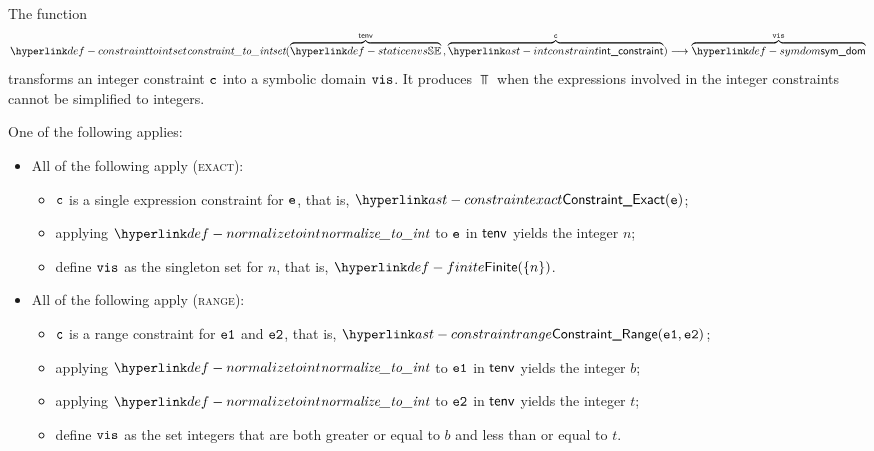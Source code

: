 \hypertarget{def-constrainttointset}{}
The function
\[
  \constrainttointset(
    \overname{\staticenvs}{\tenv} \aslsep
    \overname{\intconstraint}{\vc}
  ) \aslto
  \overname{\symdom}{\vis}
\]
transforms an integer constraint $\texttt{c}$ into a symbolic domain $\texttt{vis}$.
It produces $\Top$ when the expressions involved in the integer constraints cannot be simplified
to integers.

\ProseParagraph
One of the following applies:
\begin{itemize}
  \item All of the following apply (\textsc{exact}):
  \begin{itemize}
    \item $\texttt{c}$ is a single expression constraint for $\texttt{e}$, that is, $\ConstraintExact(\ve)$;
    \item applying $\normalizetoint$ to $\texttt{e}$ in $\textsf{tenv}$ yields the integer $n$\ProseTerminateAs{\Top};
    \item define $\texttt{vis}$ as the singleton set for $n$, that is, $\Finite(\{n\})$.
  \end{itemize}

  \item All of the following apply (\textsc{range}):
  \begin{itemize}
    \item $\texttt{c}$ is a range constraint for $\texttt{e1}$ and $\texttt{e2}$, that is, $\ConstraintRange(\veone, \vetwo)$;
    \item applying $\normalizetoint$ to $\texttt{e1}$ in $\textsf{tenv}$ yields the integer $b$\ProseTerminateAs{\Top};
    \item applying $\normalizetoint$ to $\texttt{e2}$ in $\textsf{tenv}$ yields the integer $t$\ProseTerminateAs{\Top};
    \item define $\texttt{vis}$ as the set integers that are both greater or equal to $b$ and less than or equal to $t$.
  \end{itemize}
\end{itemize}

\FormallyParagraph
{}


